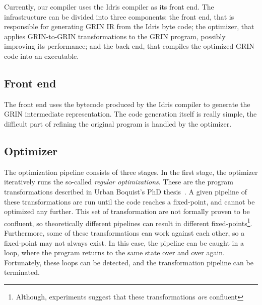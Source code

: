 \documentclass[main.tex]{subfiles}
\begin{document}
	
	Currently, our compiler uses the Idris compiler as its front end. The infrastructure can be divided into three components: the front end, that is responsible for generating GRIN IR from the Idris byte code; the optimizer, that applies GRIN-to-GRIN transformations to the GRIN program, possibly improving its performance; and the back end, that compiles the optimized GRIN code into an executable.
	
	\subsection{Front end}
	
	The front end uses the bytecode produced by the Idris compiler to generate the GRIN intermediate representation. The code generation itself is really simple, the difficult part of refining the original program is handled by the optimizer. 
	
	\subsection{Optimizer}
	
	The optimization pipeline consists of three stages. In the first stage, the optimizer iteratively runs the so-called \textit{regular optimizations}. These are the program transformations described in Urban Boquist's PhD thesis~\cite{boquist-phd}. A given pipeline of these transformations are run until the code reaches a fixed-point, and cannot be optimized any further. This set of transformation are not formally proven to be confluent, so theoretically different pipelines can result in different fixed-points\footnote{Although, experiments suggest that these transformations \textit{are} confluent}. Furthermore, some of these transformations can work against each other, so a fixed-point may not always exist. In this case, the pipeline can be caught in a loop, where the program returns to the same state over and over again. Fortunately, these loops can be detected, and the transformation pipeline can be terminated. 
	
\end{document}
